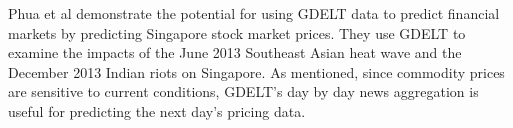 Phua et al demonstrate the potential for using GDELT data to predict financial markets by predicting Singapore stock market prices. They use GDELT  to examine the impacts of the June 2013 Southeast Asian heat wave and the December 2013 Indian riots on Singapore.\cite{phua2014visual} As mentioned, since commodity prices are sensitive to current conditions, GDELT's day by day news aggregation is useful for predicting the next day's pricing data.